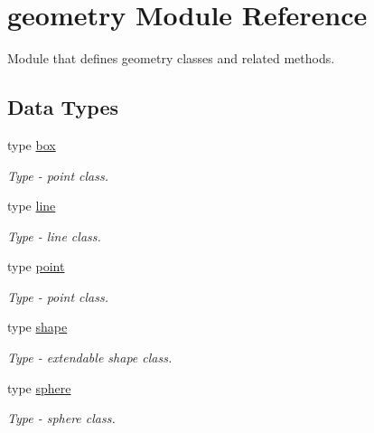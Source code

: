 \hypertarget{namespacegeometry}{}\section{geometry Module Reference}
\label{namespacegeometry}


Module that defines geometry classes and related methods.  


\subsection*{Data Types}
\begin{DoxyCompactItemize}
\item 
type \mbox{\hyperlink{structgeometry_1_1box}{box}}
\begin{DoxyCompactList}\small\item\em Type -\/ point class. \end{DoxyCompactList}\item 
type \mbox{\hyperlink{structgeometry_1_1line}{line}}
\begin{DoxyCompactList}\small\item\em Type -\/ line class. \end{DoxyCompactList}\item 
type \mbox{\hyperlink{structgeometry_1_1point}{point}}
\begin{DoxyCompactList}\small\item\em Type -\/ point class. \end{DoxyCompactList}\item 
type \mbox{\hyperlink{structgeometry_1_1shape}{shape}}
\begin{DoxyCompactList}\small\item\em Type -\/ extendable shape class. \end{DoxyCompactList}\item 
type \mbox{\hyperlink{structgeometry_1_1sphere}{sphere}}
\begin{DoxyCompactList}\small\item\em Type -\/ sphere class. \end{DoxyCompactList}\end{DoxyCompactItemize}
